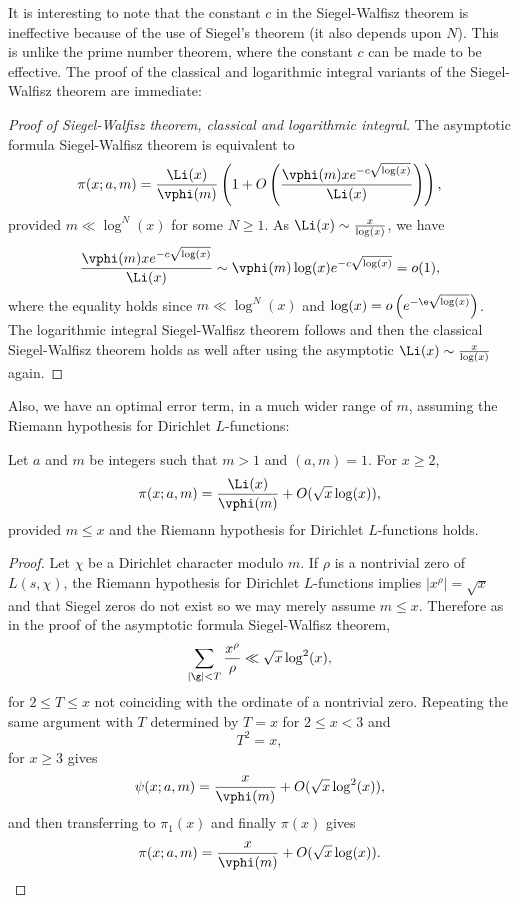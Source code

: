     It is interesting to note that the constant \(c\) in the Siegel-Walfisz theorem is ineffective because of the use of Siegel's theorem (it also depends upon \(N\)). This is unlike the prime number theorem, where the constant \(c\) can be made to be effective. The proof of the classical and logarithmic integral variants of the Siegel-Walfisz theorem are immediate:

    \begin{proof}[Proof of Siegel-Walfisz theorem, classical and logarithmic integral]
      The asymptotic formula Siegel-Walfisz theorem is equivalent to
      \[
        \pi(x;a,m) = \frac{\Li(x)}{\vphi(m)}\left(1+O\left(\frac{\vphi(m)xe^{-c\sqrt{\log(x)}}}{\Li(x)}\right)\right),
      \]
      provided \(m \ll \log^{N}(x)\) for some \(N \ge 1\). As \(\Li(x) \sim \frac{x}{\log(x)}\), we have
      \[
        \frac{\vphi(m)xe^{-c\sqrt{\log(x)}}}{\Li(x)} \sim \vphi(m)\log(x)e^{-c\sqrt{\log(x)}} = o(1),
      \]
      where the equality holds since \(m \ll \log^{N}(x)\) and \(\log(x) = o\left(e^{-\e\sqrt{\log(x)}}\right)\). The logarithmic integral Siegel-Walfisz theorem follows and then the classical Siegel-Walfisz theorem holds as well after using the asymptotic \(\Li(x) \sim \frac{x}{\log(x)}\) again.
    \end{proof}
    
    Also, we have an optimal error term, in a much wider range of \(m\), assuming the Riemann hypothesis for Dirichlet \(L\)-functions:
    
    \begin{proposition}\label{prop:Riemann_hypothesis_Siegel-Walfisz_theorem}
      Let \(a\) and \(m\) be integers such that \(m > 1\) and \((a,m) = 1\). For \(x \ge 2\),
      \[
        \pi(x;a,m) = \frac{\Li(x)}{\vphi(m)}+O(\sqrt{x}\log(x)),
      \]
      provided \(m \le x\) and the Riemann hypothesis for Dirichlet \(L\)-functions holds.
    \end{proposition}
    \begin{proof}
      Let \(\chi\) be a Dirichlet character modulo \(m\). If \(\rho\) is a nontrivial zero of \(L(s,\chi)\), the Riemann hypothesis for Dirichlet \(L\)-functions implies \(|x^{\rho}| = \sqrt{x}\) and that Siegel zeros do not exist so we may merely assume \(m \le x\). Therefore as in the proof of the asymptotic formula Siegel-Walfisz theorem,
      \[
        \sum_{|\g| < T}\frac{x^{\rho}}{\rho} \ll \sqrt{x}\log^{2}(x),
      \]
      for \(2 \le T \le x\) not coinciding with the ordinate of a nontrivial zero. Repeating the same argument with \(T\) determined by \(T = x\) for \(2 \le x < 3\) and 
      \[
        T^{2} = x,
      \]
      for \(x \ge 3\) gives
      \[
        \psi(x;a,m) = \frac{x}{\vphi(m)}+O(\sqrt{x}\log^{2}(x)),
      \]
      and then transferring to \(\pi_{1}(x)\) and finally \(\pi(x)\) gives
      \[
        \pi(x;a,m) = \frac{x}{\vphi(m)}+O(\sqrt{x}\log(x)).
      \]
      \end{proof}

